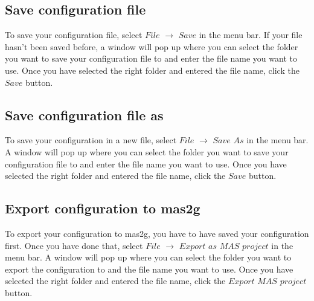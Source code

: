 \documentclass[a4paper]{article}
\begin{document}
\subsection{Save configuration file}
To save your configuration file, select $File$ $\to$ $Save$ in the menu bar. If your file hasn't been saved before, a window will pop up where you can select the folder you want to save your configuration file to and enter the file name you want to use. Once you have selected the right folder and entered the file name, click the $Save$ button.

\subsection{Save configuration file as}
To save your configuration in a new file, select $File$ $\to$ $Save$ $As$ in the menu bar. A window will pop up where you can select the folder you want to save your configuration file to and enter the file name you want to use. Once you have selected the right folder and entered the file name, click the $Save$ button.

\subsection{Export configuration to mas2g}
To export your configuration to mas2g, you have to have saved your configuration first. Once you have done that, select $File$ $\to$ $Export$ $as$ $MAS$ $project$ in the menu bar. A window will pop up where you can select the folder you want to export the configuration to and the file name you want to use. Once you have selected the right folder and entered the file name, click the $Export$ $MAS$ $project$ button.
\end{document}
